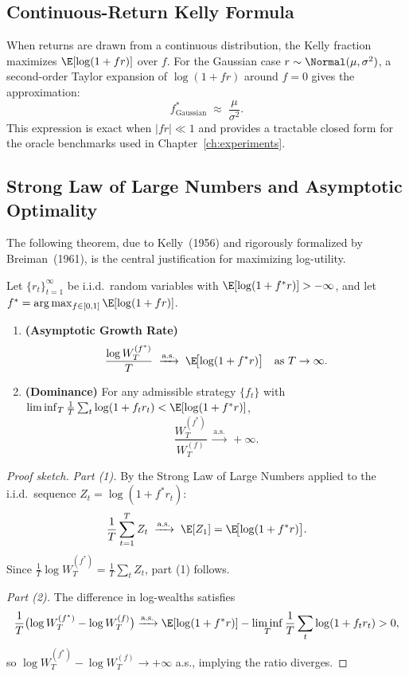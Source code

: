 \subsection{Continuous-Return Kelly Formula}

When returns are drawn from a continuous distribution, the Kelly fraction
maximizes $\E[\log(1 + fr)]$ over $f$.  For the Gaussian case
$r \sim \Normal(\mu, \sigma^2)$, a second-order Taylor expansion of
$\log(1+fr)$ around $f=0$ gives the approximation:
\begin{equation}
    f^*_{\text{Gaussian}} \;\approx\; \frac{\mu}{\sigma^2}.
    \label{eq:gaussian_kelly}
\end{equation}
This expression is exact when $|fr| \ll 1$ and provides a tractable closed
form for the oracle benchmarks used in Chapter~\ref{ch:experiments}.

\subsection{Strong Law of Large Numbers and Asymptotic Optimality}

The following theorem, due to Kelly~(1956) and rigorously formalized by
Breiman~(1961), is the central justification for maximizing log-utility.

\begin{theorem}
\label{thm:kelly_slln}
Let $\{r_t\}_{t=1}^\infty$ be i.i.d.\ random variables with
$\E[\log(1+f^* r)] > -\infty$, and let
$f^* = \arg\max_{f \in [0,1]} \E[\log(1+fr)]$.
\begin{enumerate}
    \item \textbf{(Asymptotic Growth Rate)}
          \[
              \frac{\log W_T^{(f^*)}}{T} \;\xrightarrow{\text{a.s.}}\;
              \E\!\bigl[\log(1+f^*r)\bigr] \quad \text{as } T\to\infty.
          \]
    \item \textbf{(Dominance)} For any admissible strategy $\{f_t\}$ with
          $\liminf_{T} \frac{1}{T}\sum_t \log(1+f_t r_t) < \E[\log(1+f^* r)]$,
          \[
              \frac{W_T^{(f^*)}}{W_T^{(f)}} \;\xrightarrow{\text{a.s.}}\; +\infty.
          \]
\end{enumerate}
\end{theorem}

\begin{proof}[Proof sketch]
\textit{Part (1).}
By the Strong Law of Large Numbers applied to the i.i.d.\ sequence
$Z_t = \log(1 + f^* r_t)$:
\[
    \frac{1}{T}\sum_{t=1}^T Z_t \;\xrightarrow{\text{a.s.}}\; \E[Z_1]
    = \E\!\bigl[\log(1+f^*r)\bigr].
\]
Since $\frac{1}{T}\log W_T^{(f^*)} = \frac{1}{T}\sum_t Z_t$, part (1) follows.

\textit{Part (2).}
The difference in log-wealths satisfies
\[
    \frac{1}{T}\bigl(\log W_T^{(f^*)} - \log W_T^{(f)}\bigr)
    \xrightarrow{\text{a.s.}}
    \E[\log(1+f^*r)] - \liminf_T\frac{1}{T}\sum_t \log(1+f_t r_t) > 0,
\]
so $\log W_T^{(f^*)} - \log W_T^{(f)} \to +\infty$ a.s., implying the ratio
diverges.
\end{proof}

